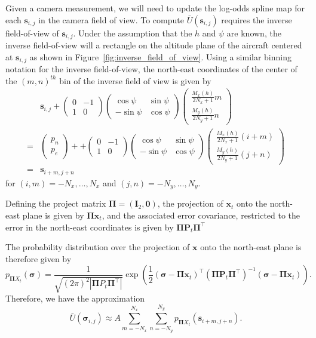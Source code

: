 \documentclass{article}
\newcommand{\sbf}{\mathbf{s}}
\newcommand{\xbf}{\mathbf{x}}
\newcommand{\Ibf}{\mathbf{I}}
\newcommand{\Pbf}{\mathbf{P}}
\newcommand{\sigmabf}{\boldsymbol{\sigma}}
\newcommand{\Pibf}{\boldsymbol{\Pi}}
\begin{document}
Given a camera measurement, we will need to update the log-odds spline map for each $\sbf_{i,j}$ in the camera field of view. To compute $\bar{U}(\sbf_{i,j})$ requires the inverse field-of-view of $\sbf_{i,j}$.  Under the assumption that the $h$ and $\psi$ are known, the inverse field-of-view will a rectangle on the altitude plane of the aircraft centered at $\sbf_{i,j}$ as shown in Figure~\ref{fig:inverse_field_of_view}.  Using a similar binning notation for the inverse field-of-view, the north-east coordinates of the center of the $(m,n)^{th}$ bin of the inverse field of view is given by
\begin{align*}
&\sbf_{i,j} + \begin{pmatrix} 0 & -1 \\ 1 & 0 \end{pmatrix} \begin{pmatrix}\cos\psi & \sin\psi \\ -\sin\psi & \cos\psi \end{pmatrix}\begin{pmatrix} \frac{M_x(h)}{2N_x+1} m \\ \frac{M_y(h)}{2N_y+1} n \end{pmatrix} \\
=& \begin{pmatrix} p_n \\ p_e \end{pmatrix} + + \begin{pmatrix} 0 & -1 \\ 1 & 0 \end{pmatrix} \begin{pmatrix}\cos\psi & \sin\psi \\ -\sin\psi & \cos\psi \end{pmatrix}\begin{pmatrix} \frac{M_x(h)}{2N_x+1} (i+m) \\ \frac{M_y(h)}{2N_y+1} (j+n) \end{pmatrix} \\
=& \sbf_{i+m, j+n}
\end{align*}
for $(i,m)=-N_x, \dots, N_x$ and $(j,n)=-N_y, \dots, N_y$.

Defining the project matrix $\Pibf = (\Ibf_2, \mathbf{0})$, the projection of $\xbf_t$ onto the north-east plane is given by $\Pibf\xbf_t$, and the associated error covariance, restricted to the error in the north-east coordinates is given by $\Pibf \Pbf_t \Pibf^\top$

 The probability distribution over the projection of $\xbf$ onto the north-east plane is therefore given by
\[
p_{\Pibf X_t}(\sigmabf) = \frac{1}{\sqrt{(2\pi)^2|\Pibf P_t \Pibf^\top|}}\exp\left(\frac{1}{2}(\sigmabf-\Pibf\xbf_t)^\top (\Pibf \Pbf_t\Pibf^\top)^{-1}(\sigmabf-\Pibf\xbf_t)\right).
\]
Therefore, we have the approximation
\begin{equation}\label{eq:approximation_of_Ubar}
\bar{U}(\sigmabf_{i,j}) \approx A \sum_{m=-N_x}^{N_x} \sum_{n=-N_y}^{N_y} p_{\Pibf X_t}(\sbf_{i+m,j+n}).
\end{equation}
\end{document}
